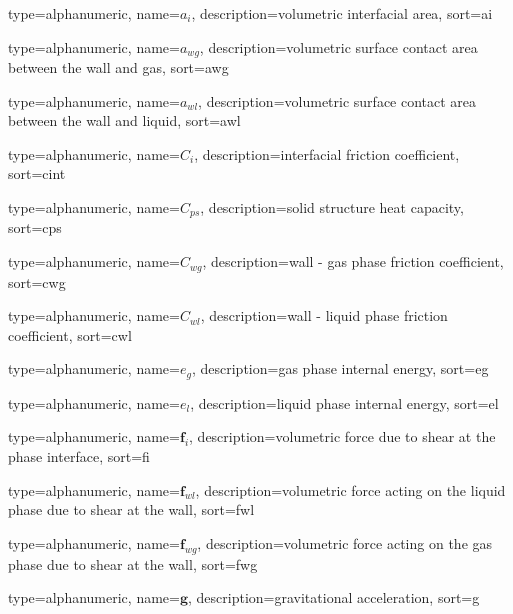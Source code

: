 
{
  type=alphanumeric,
	name={\ensuremath{a_i}},
	description={volumetric interfacial area},
	sort={ai}
}

{
  type=alphanumeric,
	name={\ensuremath{a_{wg}}},
	description={volumetric surface contact area between the wall and gas},
	sort={awg}
}

{
  type=alphanumeric,
	name={\ensuremath{a_{wl}}},
	description={volumetric surface contact area between the wall and liquid},
	sort={awl}
}

{
  type=alphanumeric,
	name={\ensuremath{C_i}},
	description={interfacial friction coefficient},
	sort={cint}
}

{
  type=alphanumeric,
	name={\ensuremath{C_{ps}}},
	description={solid structure heat capacity},
	sort={cps}
}

{
  type=alphanumeric,
	name={\ensuremath{C_{wg}}},
	description={wall - gas phase friction coefficient},
	sort={cwg}
}

{
  type=alphanumeric,
	name={\ensuremath{C_{wl}}},
	description={wall - liquid phase friction coefficient},
	sort={cwl}
}

{
  type=alphanumeric,
	name={\ensuremath{e_g}},
	description={gas phase internal energy},
	sort={eg}
}

{
  type=alphanumeric,
	name={\ensuremath{e_l}},
	description={liquid phase internal energy},
	sort={el}
}

{
  type=alphanumeric,
	name={\ensuremath{\mathbf{f}_i}},
	description={volumetric force due to shear at the phase interface},
	sort={fi}
}

{
  type=alphanumeric,
	name={\ensuremath{\mathbf{f}_{wl}}},
	description={volumetric force acting on the liquid phase due to shear at the wall},
	sort={fwl}
}

{
  type=alphanumeric,
	name={\ensuremath{\mathbf{f}_{wg}}},
	description={volumetric force acting on the gas phase due to shear at the wall},
	sort={fwg}
}

{
  type=alphanumeric,
	name={\ensuremath{\mathbf{g}}},
	description={gravitational acceleration},
	sort={g}
}

